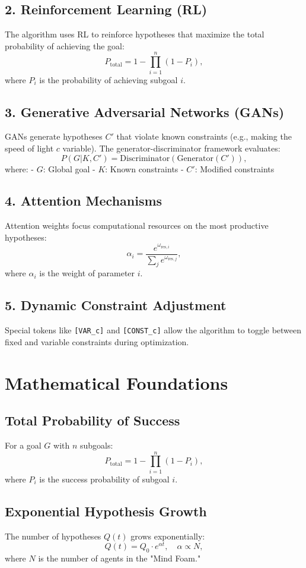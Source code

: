 \documentclass[12pt]{article}
\begin{document}
\subsection{2. Reinforcement Learning (RL)}
The algorithm uses RL to reinforce hypotheses that maximize the total probability of achieving the goal:
$$
P_{\text{total}} = 1 - \prod_{i=1}^n (1 - P_i),
$$
where $ P_i $ is the probability of achieving subgoal $ i $.

\subsection{3. Generative Adversarial Networks (GANs)}
GANs generate hypotheses $ C' $ that violate known constraints (e.g., making the speed of light $ c $ variable). The generator-discriminator framework evaluates:
$$
P(G|K, C') = \text{Discriminator}(\text{Generator}(C')),
$$
where:
- $ G $: Global goal
- $ K $: Known constraints
- $ C' $: Modified constraints

\subsection{4. Attention Mechanisms}
Attention weights focus computational resources on the most productive hypotheses:
$$
\alpha_i = \frac{e^{\omega_{\text{res},i}}}{\sum_j e^{\omega_{\text{res},j}}},
$$
where $ \alpha_i $ is the weight of parameter $ i $.

\subsection{5. Dynamic Constraint Adjustment}
Special tokens like \texttt{[VAR\_c]} and \texttt{[CONST\_c]} allow the algorithm to toggle between fixed and variable constraints during optimization.

\section{Mathematical Foundations}
\subsection{Total Probability of Success}
For a goal $ G $ with $ n $ subgoals:
$$
P_{\text{total}} = 1 - \prod_{i=1}^n (1 - P_i),
$$
where $ P_i $ is the success probability of subgoal $ i $.

\subsection{Exponential Hypothesis Growth}
The number of hypotheses $ Q(t) $ grows exponentially:
$$
Q(t) = Q_0 \cdot e^{\alpha t}, \quad \alpha \propto N,
$$
where $ N $ is the number of agents in the "Mind Foam."
\end{document}
